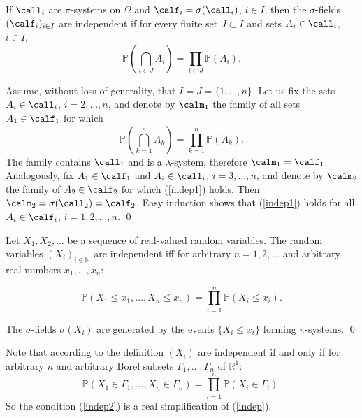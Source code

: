 \documentclass[preprint]{imsart}
\def\P{\mathbb P}
\def\N{\mathbb N}
\def\R{\mathbb R}
\begin{document}
{\begin{Proposition}
  If $\call_i$ are $\pi$-systems on $\Omega$ and
  $\calf_i=\sigma(\call_i)$, $i\in I$, then the
  $\sigma$-fields $(\calf_i)_{i\in I}$ are
  independent if for every finite set $J\subset I$
  and sets $A_i\in \call_i$,  $i\in I$,
$$
 \P\left( \bigcap_{i\in J}A_i\right) =
  \prod_{i\in J} \P\left(A_i\right).
  $$
\end{Proposition}

Assume, without loss of generality, that
$I=J=\{1,\ldots,n\}$. Let us fix the sets
$A_i\in\call_i$, $i=2,\ldots,n$, and denote by
$\calm_1$ the family of all sets $A_1\in\calf_1$ for
which
\begin{equation}\label{indep1}
   \P\left( \bigcap_{k=1}^nA_k\right) =
  \prod_{k=1}^n \P\left(A_k\right).
\end{equation}
The family contains $\call_1$ and is a
$\lambda$-system, therefore $\calm_1=\calf_1$.
Analogously, fix $A_1\in\calf_1$ and $A_i\in\call_i$,
$i=3,\ldots,n$, and denote by $\calm_2$ the family of
$A_2\in\calf_2$ for which (\ref{indep1}) holds. Then
$\calm_2=\sigma(\call_2)=\calf_2$. Easy induction shows
that (\ref{indep1}) holds for all $A_i\in\calf_i$,
$i=1,2,\ldots,n$. \qed


\begin{Corollary}
  Let $X_1,X_2,\ldots $ be a sequence of real-valued
  random variables. The random variables $(X_i)_{i\in\N}$
  are independent iff for arbitrary $n=1,2,\ldots$ and
  arbitrary real numbers $x_1,\ldots,x_n$:

\begin{equation}\label{indep2}
  \P(X_1\leq x_1,\ldots,X_n\leq x_n)
  =\prod_{i=1}^n\P(X_i\leq x_i).
\end{equation}


\end{Corollary}

 The $\sigma$-fields
$\sigma(X_i)$ are generated by the events $\{X_i\leq
x_i\}$ forming  $\pi$-systems. \qed

\begin{Remark}\begin{em}
  Note that according to the definition $(X_i)$ are
  independent if and only if for arbitrary $n$ and arbitrary
  Borel subsets $\Gamma_1,\ldots,\Gamma_n$ of $\R^1$:
$$
 \P(X_1\in\Gamma_1,\ldots,X_n\in\Gamma_n)
  =\prod_{i=1}^n\P(X_i\in\Gamma_i).
  $$
  So the condition (\ref{indep2}) is a real
  simplification of (\ref{indep}).
\end{em}
\end{Remark}



}
\end{document}
